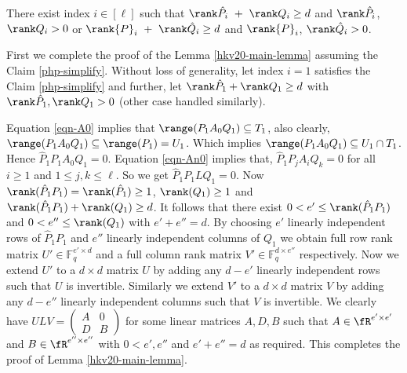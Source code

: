 \begin{claim} \label{php-simplify}
There exist index $i \in[\ell]$ such that $\rank \hat{P}_i ~+~ \rank Q_i \geq d$ and $\rank \hat{P}_i$, $\rank Q_i>0$ or $\rank {P}_i ~+~ \rank \hat{Q}_i \geq d$ and $\rank {P}_i$, $\rank \hat{Q}_i>0$. 
\end{claim}
First we complete the proof of the Lemma \ref{hkv20-main-lemma} assuming the Claim \ref{php-simplify}.
Without loss of generality, let index $i=1$ satisfies the Claim \ref{php-simplify} and further, let $\rank
\hat{P}_1 + \rank Q_1 \geq d$ with $\rank \hat{P}_1, \rank Q_1 >0$
(other case handled similarly).

Equation \ref{eqn-A0} implies that $\range(P_1 A_0 Q_1) \subseteq
T_1$, also clearly, $\range(P_1 A_0 Q_1) \subseteq \range(P_1)=
U_1$. Which implies $\range(P_1 A_0 Q_1)\subseteq U_1 \cap T_1$. Hence
$\hat{P}_1 P_1 A_0 Q_1 =0$. Equation \ref{eqn-An0} implies that,
$\hat{P}_1 P_j A_i Q_k= 0$ for all $i \geq 1$ and $1\leq j, k \leq
\ell$. So we get $\hat{P}_1 P_1 L Q_1 = 0$. Now $\rank(\hat{P}_1P_1) =
\rank(\hat{P}_1)\geq 1$, $\rank(Q_1) \geq 1$ and $\rank(\hat{P}_1
P_1)+\rank(Q_1) \geq d$. It follows that there exist $0 < e' \leq
\rank(\hat{P}_1 P_1)$ and $0 < e'' \leq \rank(Q_1)$ with $e'+e'' =
d$. By choosing $e'$ linearly independent rows of $\hat{P}_1P_1$ and
$e''$ linearly independent columns of $Q_1$ we obtain full row rank
matrix $U' \in \mathbb{F}_q^{e' \times d}$ and a full column rank
matrix $V' \in \mathbb{F}_q^{d \times e''}$ respectively.  Now we
extend $U'$ to a $d \times d$ matrix $U$ by adding any $d-e'$ linearly
independent rows such that $U$ is invertible. Similarly we extend $V'$
to a $d \times d$ matrix $V$ by adding any $d-e''$ linearly
independent columns such that $V$ is invertible. We clearly have $ULV
=\left(
\begin{array}{c|c}
A & 0 \\
\hline
D & B
\end{array}
\right)$ for some linear matrices $A, D, B$ such that $A \in \fR^{e' \times e'}$ and $B \in \fR^{e'' \times e''}$ with $0< e', e''$ and $e' + e'' =d$ as required. This completes the proof of Lemma \ref{hkv20-main-lemma}.
\\

